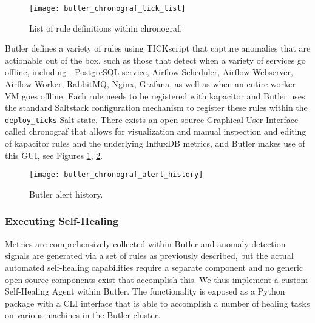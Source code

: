 \begin{figure}[h]
    \texttt{[image: butler\_chronograf\_tick\_list]}
    \centering
    \caption {List of rule definitions within chronograf.}
    \label{fig:butler_chronograf_tick_list}
\end{figure} 

Butler defines a variety of rules using TICKscript that capture anomalies that are actionable out of the box, such as those that detect when a variety of services go offline, including - PostgreSQL service, Airflow Scheduler, Airflow Webserver, Airflow Worker, RabbitMQ, Nginx, Grafana, as well as when an entire worker VM goes offline. Each rule needs to be registered with kapacitor and Butler uses the standard Saltstack configuration mechanism to register these rules within the \texttt{deploy_ticks} Salt state. There exists an open source Graphical User Interface called chronograf\autocite{chronograf} that allows for visualization and manual inspection and editing of kapacitor rules and the underlying InfluxDB metrics, and Butler makes use of this GUI, see Figures \ref{fig:butler_chronograf_tick_list}, \ref{fig:butler_chronograf_alert_history}.

\begin{figure}[h]
    \texttt{[image: butler\_chronograf\_alert\_history]}
    \centering
    \caption {Butler alert history.}
    \label{fig:butler_chronograf_alert_history}
\end{figure} 

\subsubsection{Executing Self-Healing}

Metrics are comprehensively collected within Butler and anomaly detection signals are generated via a set of rules as previously described, but the actual automated self-healing capabilities require a separate component and no generic open source components exist that accomplish this. We thus implement a custom Self-Healing Agent within Butler. The functionality is exposed as a Python package with a CLI interface that is able to accomplish a number of healing tasks on various machines in the Butler cluster.

